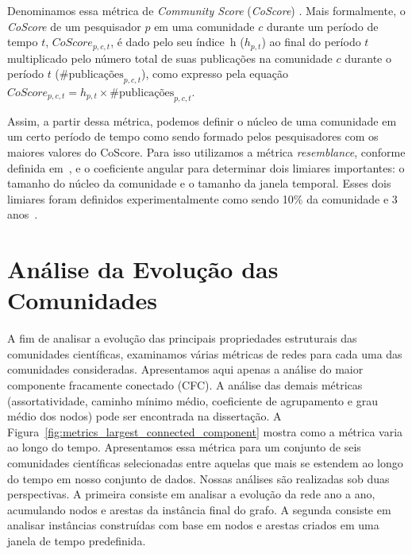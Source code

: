 \documentclass[12pt]{article}
\begin{document}
Denominamos essa métrica de \textit{Community Score} (\textit{CoScore}) \cite{Alves2013}. 
Mais formalmente, o \textit{CoScore} de um pesquisador $p$ em uma 
comunidade $c$ durante um período de tempo $t$, $\textit{CoScore}_{p,c,t}$, é dado 
pelo seu índice~h ($h_{p,t}$) ao final do período $t$ multiplicado pelo 
número total de suas publicações na comunidade $c$ durante o período $t$ ($\textrm{\#}\text{publicações}_{p,c,t}$),
como expresso pela equação $\textit{CoScore}_{p,c,t} = h_{p,t} \times 
\textrm{\#}\text{publicações}_{p,c,t}$.

Assim, a partir dessa métrica, podemos definir o núcleo de uma comunidade
em um certo período de tempo como sendo formado pelos pesquisadores com os
maiores valores do CoScore. Para isso utilizamos a métrica 
\textit{resemblance}, conforme definida em~\cite{Viswanath2009}, e o
coeficiente angular para determinar dois limiares importantes: o tamanho
do núcleo da comunidade e o tamanho da janela temporal. Esses dois
limiares foram definidos experimentalmente como sendo 10\% da comunidade e
3 anos~\cite{Alves2013}.

\section{Análise da Evolução das Comunidades}

A fim de analisar a evolução das principais propriedades estruturais das comunidades científicas, examinamos várias métricas 
de redes para cada uma das comunidades consideradas. Apresentamos aqui apenas a análise do maior componente fracamente conectado 
(CFC). A análise das demais métricas (assortatividade, caminho 
mínimo médio, coeficiente de agrupamento e grau médio dos nodos) pode ser encontrada na dissertação. 
A Figura~\ref{fig:metrics_largest_connected_component}
mostra como a métrica varia ao longo do tempo. Apresentamos essa métrica para um conjunto de seis 
comunidades científicas selecionadas entre aquelas que mais se estendem ao longo do tempo em nosso conjunto de dados.
Nossas análises são realizadas sob duas perspectivas. A primeira consiste em analisar a evolução da rede ano a ano, acumulando 
nodos e arestas da instância final do grafo. A segunda consiste em analisar instâncias construídas com base em nodos e 
arestas criados em uma janela de tempo predefinida.
\end{document}
